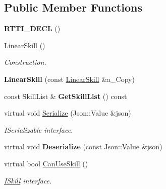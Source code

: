 \subsection*{Public Member Functions}
\begin{DoxyCompactItemize}
\item 
\mbox{\label{class_linear_skill_ab453748493c75ef7f1dba656d6d849f2}} 
{\bfseries R\+T\+T\+I\+\_\+\+D\+E\+CL} ()
\item 
\mbox{\label{class_linear_skill_aa3c88b2ed0545d6aad38d45c380c38bb}} 
\hyperlink{class_linear_skill_aa3c88b2ed0545d6aad38d45c380c38bb}{Linear\+Skill} ()
\begin{DoxyCompactList}\small\item\em Construction. \end{DoxyCompactList}\item 
\mbox{\label{class_linear_skill_a257c1367e67ea9f84b402d76e796782e}} 
{\bfseries Linear\+Skill} (const \hyperlink{class_linear_skill}{Linear\+Skill} \&a\+\_\+\+Copy)
\item 
\mbox{\label{class_linear_skill_a616095c8244d6a240ecec6ca5ae45a5f}} 
const Skill\+List \& {\bfseries Get\+Skill\+List} () const
\item 
\mbox{\label{class_linear_skill_a848dd09f0e2c7db9a096e57a75266f40}} 
virtual void \hyperlink{class_linear_skill_a848dd09f0e2c7db9a096e57a75266f40}{Serialize} (Json\+::\+Value \&json)
\begin{DoxyCompactList}\small\item\em I\+Serializable interface. \end{DoxyCompactList}\item 
\mbox{\label{class_linear_skill_a1cb12edb6cf2864dec3bda655b709ed1}} 
virtual void {\bfseries Deserialize} (const Json\+::\+Value \&json)
\item 
\mbox{\label{class_linear_skill_ad19e09038c5bc3cd0f3f3a97651e3dd8}} 
virtual bool \hyperlink{class_linear_skill_ad19e09038c5bc3cd0f3f3a97651e3dd8}{Can\+Use\+Skill} ()
\begin{DoxyCompactList}\small\item\em \hyperlink{class_i_skill}{I\+Skill} interface. \end{DoxyCompactList}\item 

\end{DoxyCompactItemize}

